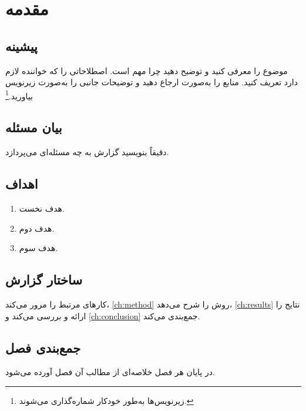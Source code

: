 \chapter{مقدمه}

\section{پیشینه}
موضوع را معرفی کنید و توضیح دهید چرا مهم است. اصطلاحاتی را که خواننده لازم دارد تعریف کنید.
منابع را به‌صورت \cite{knuth1984} ارجاع دهید و توضیحات جانبی را به‌صورت زیرنویس بیاورید.\footnote{زیرنویس‌ها به‌طور خودکار شماره‌گذاری می‌شوند.}

\section{بیان مسئله}
دقیقاً بنویسید گزارش به چه مسئله‌ای می‌پردازد.

\section{اهداف}
\begin{enumerate}
  \item هدف نخست.
  \item هدف دوم.
  \item هدف سوم.
\end{enumerate}

\section{ساختار گزارش}
 کارهای مرتبط را مرور می‌کند، \cref{ch:method} روش را شرح می‌دهد، \cref{ch:results}
نتایج را ارائه و بررسی می‌کند و \cref{ch:conclusion} جمع‌بندی می‌کند.

\section{جمع‌بندی فصل}
در پایان هر فصل خلاصه‌ای از مطالب آن فصل آورده می‌شود.
